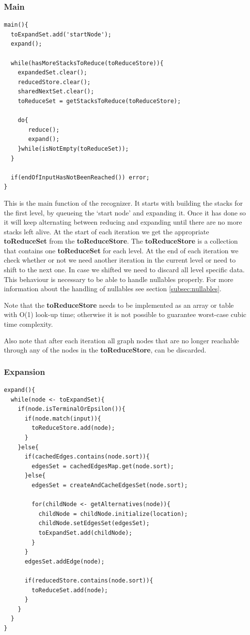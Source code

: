 \documentclass[a4paper,10pt]{article}
\begin{document}
\subsubsection{Main}
{\small
\begin{verbatim}
main(){
  toExpandSet.add('startNode');
  expand();
  
  while(hasMoreStacksToReduce(toReduceStore)){
    expandedSet.clear();
    reducedStore.clear();
    sharedNextSet.clear();
    toReduceSet = getStacksToReduce(toReduceStore);
    
    do{
       reduce();
       expand();
    }while(isNotEmpty(toReduceSet));
  }
  
  if(endOfInputHasNotBeenReached()) error;
}
\end{verbatim}
}

This is the main function of the recognizer. It starts with building the stacks for the first level, by queueing the `start node' and expanding it. Once it has done so it will keep alternating between reducing and expanding until there are no more stacks left alive. At the start of each iteration we get the appropriate {\bf toReduceSet} from the {\bf toReduceStore}. The {\bf toReduceStore} is a collection that contains one {\bf toReduceSet} for each level. At the end of each iteration we check whether or not we need another iteration in the current level or need to shift to the next one. In case we shifted we need to discard all level specific data. This behaviour is necessary to be able to handle nullables properly. For more information about the handling of nullables see section \ref{subsec:nullables}.

Note that the {\bf toReduceStore} needs to be implemented as an array or table with O(1) look-up time; otherwise it is not possible to guarantee worst-case cubic time complexity.

Also note that after each iteration all graph nodes that are no longer reachable through any of the nodes in the {\bf toReduceStore}, can be discarded.

\pagebreak
\subsubsection{Expansion}
\label{subsec:pseudocodeExpand}
{\small
\begin{verbatim}
expand(){
  while(node <- toExpandSet){
    if(node.isTerminalOrEpsilon()){
      if(node.match(input)){
        toReduceStore.add(node);
      }
    }else{
      if(cachedEdges.contains(node.sort)){
        edgesSet = cachedEdgesMap.get(node.sort);
      }else{
        edgesSet = createAndCacheEdgesSet(node.sort);
        
        for(childNode <- getAlternatives(node)){
          childNode = childNode.initialize(location);
          childNode.setEdgesSet(edgesSet);
          toExpandSet.add(childNode);
        }
      }
      edgesSet.addEdge(node);
      
      if(reducedStore.contains(node.sort)){
        toReduceSet.add(node);
      }
    }
  }
}
\end{verbatim}
}
\end{document}
